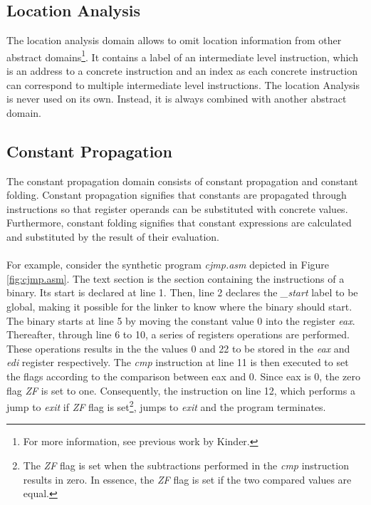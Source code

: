 \documentclass{kththesis}
\newcommand{\fbcomment}[1]{{#1}}
\renewcommand{\fbcomment}[1]{}
\renewcommand{\it}[1]{\textit{#1}}
\begin{document}
\subsection{Location Analysis}\label{sec:absDomLoc}
The location analysis domain allows to omit location information from other abstract domains\footnote{For more information, see previous work by Kinder\cite{Jakstab}.}. It contains a label of an intermediate level instruction, which is an address to a concrete instruction and an index as each concrete instruction can correspond to multiple intermediate level instructions. The location Analysis is never used on its own. Instead, it is always combined with another abstract domain.

\subsection{Constant Propagation}\label{sec:absDomCon}
\fbcomment{\color{red}Goal: Introduce constant propagation and show a basic example of how it is used.}
The constant propagation domain consists of constant propagation and constant folding. Constant propagation signifies that constants are propagated through instructions so that register operands can be substituted with concrete values. Furthermore, constant folding signifies that constant expressions are calculated and substituted by the result of their evaluation.
\\ \\
For example, consider the synthetic program \it{cjmp.asm} depicted in Figure \ref{fig:cjmp.asm}. The text section is the section containing the instructions of a binary. Its start is declared at line 1. Then, line 2 declares the \it{\_start} label to be global, making it possible for the linker to know where the binary should start. The binary starts at line 5 by moving the constant value 0 into the register \it{eax}. Thereafter, through line 6 to 10, a series of registers operations are performed. These operations results in the the values 0 and 22 to be stored in the \it{eax} and \it{edi} register respectively. The \it{cmp} instruction at line 11 is then executed to set the flags according to the comparison between eax and 0. Since eax is 0, the zero flag \it{ZF} is set to one. Consequently, the instruction on line 12, which performs a jump to \it{exit} if \it{ZF} flag is set\footnote{The \it{ZF} flag is set when the subtractions performed in the \it{cmp} instruction results in zero. In essence, the \it{ZF} flag is set if the two compared values are equal.}, jumps to \it{exit} and the program terminates. 
\end{document}
